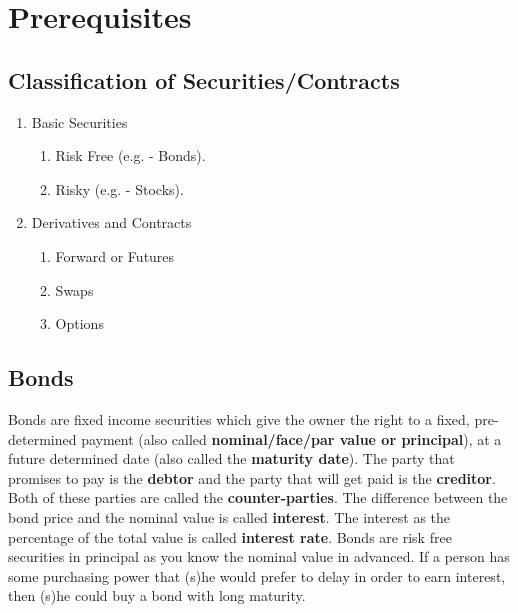 \chapter{Prerequisites}

\section{Classification of Securities/Contracts}
\begin{enumerate}
    \item Basic Securities 
    \begin{enumerate}
        \item Risk Free (e.g. - Bonds).
        \item Risky (e.g. - Stocks).
    \end{enumerate}
    \item Derivatives and Contracts
    \begin{enumerate}
        \item Forward or Futures
        \item Swaps
        \item Options
    \end{enumerate}
\end{enumerate}

\section{Bonds}
Bonds are fixed income securities which give the owner the right to a fixed, pre-determined payment (also called \textbf{nominal/face/par value or principal}), at a future determined date (also called the \textbf{maturity date}). The party that promises to pay is the \textbf{debtor} and the party that will get paid is the \textbf{creditor}. Both of these parties are called the \textbf{counter-parties}. The difference between the bond price and the nominal value is called \textbf{interest}. The interest as the percentage of the total value is called \textbf{interest rate}. Bonds are risk free securities in principal as you know the nominal value in advanced. If a person has some purchasing power that (s)he would prefer to delay in order to earn interest, then (s)he could buy a bond with long maturity. 
